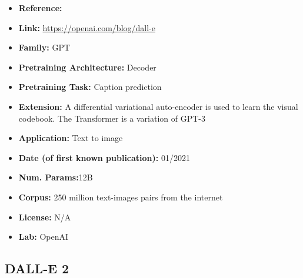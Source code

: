 \documentclass{article}
\begin{document}
            \begin{itemize}
                \item \textbf{Reference:} 
                \item \textbf{Link:} \url{https://openai.com/blog/dall-e}
                \item \textbf{Family:} GPT 
                \item \textbf{Pretraining Architecture:} Decoder
                \item \textbf{Pretraining Task:} Caption prediction
                \item \textbf{Extension:} A differential variational auto-encoder is used to learn the visual codebook. The Transformer is a variation of GPT-3  
                \item \textbf{Application:} Text to image
                \item \textbf{Date (of first known publication):} 01/2021
                \item \textbf{Num. Params:}12B
                \item \textbf{Corpus:} 250 million text-images pairs from the internet
                \item \textbf{License:} N/A
                \item \textbf{Lab:} OpenAI
            \end{itemize}
            
\subsection{DALL-E 2}
\end{document}
